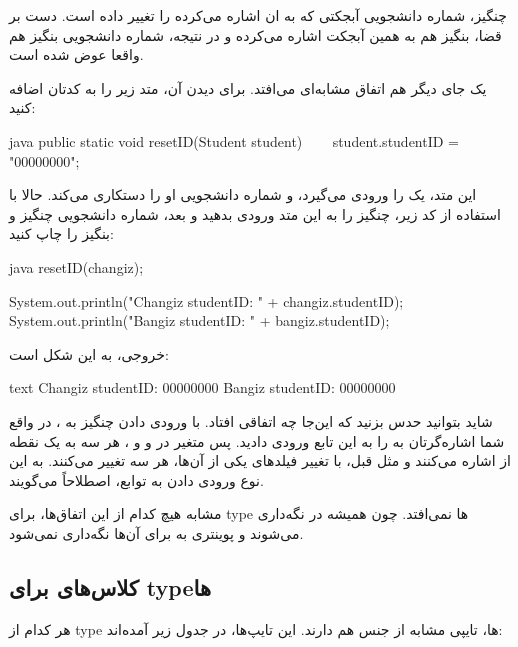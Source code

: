 چنگیز، شماره دانشجویی آبجکتی که به ان اشاره می‌کرده را تغییر داده است.
دست بر قضا، بنگیز هم به همین آبجکت اشاره می‌کرده و در نتیجه، شماره
دانشجویی بنگیز هم واقعا عوض شده است.

یک جای دیگر هم اتفاق مشابه‌ای می‌افتد. برای دیدن آن، متد زیر را به کدتان
اضافه کنید:

\begin{codebox}{java}
public static void resetID(Student student) {  
    student.studentID = "00000000";  
}
\end{codebox}

این متد، یک  را ورودی می‌گیرد، و شماره دانشجویی‌ او
را دستکاری می‌کند. حالا با استفاده از کد زیر، چنگیز را به این متد ورودی
بدهید و بعد، شماره دانشجویی چنگیز و بنگیز را چاپ کنید:

\begin{codebox}{java}
resetID(changiz);  
  
System.out.println("Changiz studentID: " + changiz.studentID);  
System.out.println("Bangiz studentID: " + bangiz.studentID);
\end{codebox}

خروجی، به این شکل است:

\begin{codebox}{text}
Changiz studentID: 00000000  
Bangiz studentID: 00000000
\end{codebox}

شاید بتوانید حدس بزنید که این‌جا چه اتفاقی افتاد. با ورودی دادن چنگیز به
 ، در واقع شما اشاره‌گرتان به  را به این
تابع ورودی دادید. پس متغیر  در
 و  و  ،
هر سه به یک نقطه از  اشاره می‌کنند و مثل قبل، با تغییر فیلدهای
یکی از آن‌ها، هر سه تغییر می‌کنند. به این نوع ورودی دادن به توابع، اصطلاحاً
 می‌گویند.

مشابه هیچ کدام از این اتفاق‌ها، برای  type‌ ها نمی‌افتد. چون
همیشه در  نگه‌داری می‌شوند و پوینتری به  برای آن‌ها
نگه‌داری نمی‌شود.

\subsection{کلاس‌های  برای  type‌ها}

هر کدام از  type‌ ها، تایپی مشابه از جنس
 هم دارند. این تایپ‌ها، در جدول زیر آمده‌اند:

